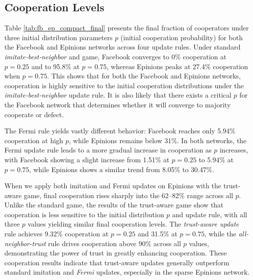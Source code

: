\subsection{Cooperation Levels}
Table \ref{tab:fb_ep_compact_final} presents the final fraction of cooperators under three initial distribution parameters \(p\) (initial cooperation probability) for both the Facebook and Epinions networks across four update rules. 
Under standard \emph{imitate‐best‐neighbor} and game, Facebook converges to 0\% cooperation at \(p=0.25\) and to 95.8\% at \(p=0.75\), whereas Epinions peaks at 27.4\% cooperation when \(p=0.75\). 
This shows that for both the Facebook and Epinions networks, cooperation is highly sensitive to the initial cooperation distributions under the \emph{imitate‐best‐neighbor} update rule. 
It is also likely that there exists a critical \(p\) for the Facebook network that determines whether it will converge to majority cooperate or defect.

The Fermi rule yields vastly different behavior: Facebook reaches only 5.94\% cooperation at high \(p\), while Epinions remains below 31\%. 
In both networks, the Fermi update rule leads to a more gradual increase in cooperation as \(p\) increases, with Facebook showing a slight increase from 1.51\% at \(p=0.25\) to 5.94\% at \(p=0.75\), while Epinions shows a similar trend from 8.05\% to 30.47\%.

When we apply both imitation and Fermi updates on Epinions with the trust-aware game, final cooperation rises sharply into the 62–82\% range across all \(p\). 
Unlike the standard game, the results of the trust-aware game show that cooperation is less sensitive to the initial distribution \(p\) and update rule, with all three \(p\) values yielding similar final cooperation levels.
The \emph{trust-aware update} rule achieves 9.32\% cooperation at \(p=0.25\) and 31.5\% at \(p=0.75\), while the \emph{all-neighbor-trust} rule drives cooperation above 90\% across all \(p\) values, demonstrating the power of trust in greatly enhancing cooperation.
These cooperation results indicate that trust-aware updates generally outperform standard imitation and \emph{Fermi} updates, especially in the sparse Epinions network.


